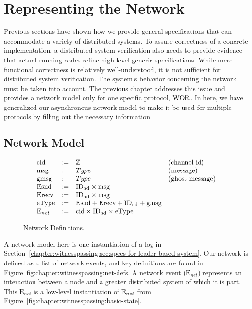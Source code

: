\section{Representing the Network}
\label{chapter:witnesspassing:sec:low-level-implementation}


Previous sections have shown how we provide general specifications
that can accommodate a variety of distributed systems.  To assure correctness of a concrete implementation, a distributed system verification also needs to
provide evidence that actual running codes refine high-level generic
specifications. While mere functional correctness is relatively well-understood,
it is not sufficient for distributed system verification. The
system's behavior concerning the network must be taken into account. 
The previous chapter addresses this issue and provides a network model only for one specific protocol, $\mathrm{WOR}$. 
In here, we have generalized our asynchronous network model to make it be used for multiple protocols by filling out the necessary information. 




\subsection{Network Model}
\label{chapter:witnesspassing:subsec:network-model}

\begin{figure}
\begin{small}
\raggedright
$$
\begin{array}{llll}
\mathrm{cid} & := & \mathbb{Z} & \mbox{(channel id)} \\
\mathrm{msg} & : & Type & \mbox{(message)} \\
\mathrm{gmsg} & : & Type & \mbox{(ghost message)} \\
\mathrm{Esnd} & := & \mathrm{ID_{nd}} \times \mathrm{msg} \\
\mathrm{Erecv} & := & \mathrm{ID_{nd}} \times \mathrm{msg} \\
\mathrm{eType} & := & \mathrm{Esnd} + \mathrm{Erecv} + \mathrm{ID_{nd}} + \mathrm{gmsg} \\
\mathrm{E}_{net} & := & \mathrm{cid} \times \mathrm{ID_{nd}} \times \mathrm{eType} \\
\end{array}
$$
\end{small}
\caption{Network Definitions.}
\label{fig:chapter:witnesspassing:net-defs}
\end{figure}


A network model here is one instantiation of a log in
 Section~\ref{chapter:witnesspassing:sec:specs-for-leader-based-system}. Our network is defined as a list of
network events, and key definitions are found in Figure~{fig:chapter:witnesspassing:net-defs}. A
network event ($\mathrm{E}_{net}$) represents an interaction between a node and
a greater distributed system of which it is part. This $\mathrm{E}_{net}$ is a
low-level instantiation of ${\mathbb{E}_{net}}$ from Figure~\ref{fig:chapter:witnesspassing:basic-state}.

